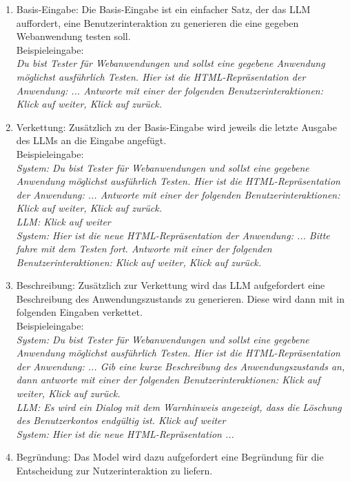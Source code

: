 \begin{enumerate}
    \item Basis-Eingabe: Die Basis-Eingabe ist ein einfacher Satz, der das LLM auffordert, eine Benutzerinteraktion zu generieren die eine gegeben Webanwendung testen soll.
    \\
    Beispieleingabe:
    \\
    \textit{Du bist Tester für Webanwendungen und sollst eine gegebene Anwendung möglichst ausführlich Testen.
    Hier ist die HTML-Repräsentation der Anwendung: ...
    Antworte mit einer der folgenden Benutzerinteraktionen: Klick auf \dq weiter\dq, Klick auf \dq zurück\dq.}
    \item Verkettung: Zusätzlich zu der Basis-Eingabe wird jeweils die letzte Ausgabe des LLMs an die Eingabe angefügt.
    \\
    Beispieleingabe:
    \\
    \textit{System: Du bist Tester für Webanwendungen und sollst eine gegebene Anwendung möglichst ausführlich Testen.
    Hier ist die HTML-Repräsentation der Anwendung: ...
    Antworte mit einer der folgenden Benutzerinteraktionen: Klick auf \dq weiter\dq, Klick auf \dq zurück\dq.
    \\
    LLM: Klick auf \dq weiter\dq
    \\
    System: Hier ist die neue HTML-Repräsentation der Anwendung: ... Bitte fahre mit dem Testen fort. Antworte mit einer der folgenden Benutzerinteraktionen: Klick auf \dq weiter\dq, Klick auf \dq zurück\dq.
    }
    \item Beschreibung: Zusätzlich zur Verkettung wird das LLM aufgefordert eine Beschreibung des Anwendungszustands zu generieren. Diese wird dann mit in folgenden Eingaben verkettet.
    \\
    Beispieleingabe:
    \\
    \textit{System: Du bist Tester für Webanwendungen und sollst eine gegebene Anwendung möglichst ausführlich Testen.
    Hier ist die HTML-Repräsentation der Anwendung: ... 
    Gib eine kurze Beschreibung des Anwendungszustands an, dann antworte mit einer der folgenden Benutzerinteraktionen: Klick auf \dq weiter\dq, Klick auf \dq zurück\dq.
    \\
    LLM: Es wird ein Dialog mit dem Warnhinweis angezeigt, dass die Löschung des Benutzerkontos endgültig ist. Klick auf \dq weiter\dq
    \\
    System: Hier ist die neue HTML-Repräsentation ...
    }
    \item Begründung: Das Model wird dazu aufgefordert eine Begründung für die Entscheidung zur Nutzerinteraktion zu liefern.

\end{enumerate}
